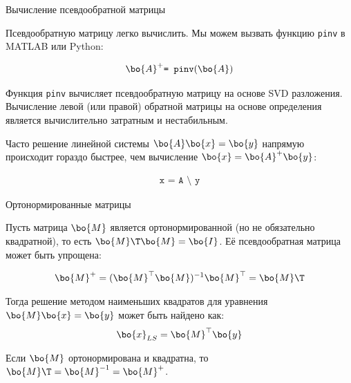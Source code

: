 \documentclass{beamer}
\begin{document}
\begin{frame}{Вычисление псевдообратной матрицы}
	\begin{flushleft}
		
		Псевдообратную матрицу легко вычислить. Мы можем вызвать функцию \texttt{pinv} в MATLAB или Python:
		
		\begin{align*}
			\bo{A}^+ \texttt{= pinv}(\bo{A})
		\end{align*}
		
		\bigskip
		
		Функция \texttt{pinv} вычисляет псевдообратную матрицу на основе SVD разложения. Вычисление левой (или правой) обратной матрицы на основе определения является вычислительно затратным и нестабильным.
		
		\bigskip
		
		Часто решение линейной системы $\bo{A}\bo{x} = \bo{y}$ напрямую происходит гораздо быстрее, чем вычисление $\bo{x} = \bo{A}^+\bo{y}$:
		
		\begin{align*}
			\texttt{x = A \textbackslash \  y}
		\end{align*}
		
		
	\end{flushleft}
\end{frame}






\begin{frame}{Ортонормированные матрицы}
	\begin{flushleft}
		
		Пусть матрица $\bo{M}$ является ортонормированной (но не обязательно квадратной), то есть $\bo{M}\T \bo{M} = \bo{I}$. Её псевдообратная матрица может быть упрощена:
		
		\begin{align}
			\bo{M}^+ = (\bo{M}^\top\bo{M})^{-1} \bo{M}^\top = \bo{M}\T
		\end{align}
		
		\bigskip
		
		Тогда решение методом наименьших квадратов для уравнения $\bo{M} \bo{x} = \bo{y}$ может быть найдено как:
		\begin{align}
			\bo{x}_{LS} = \bo{M}^\top \bo{y}
		\end{align}
		
		Если $\bo{M}$ ортонормирована и квадратна, то $\bo{M}\T = \bo{M}^{-1} = \bo{M}^+$.
		
		
	\end{flushleft}
\end{frame}
\end{document}
